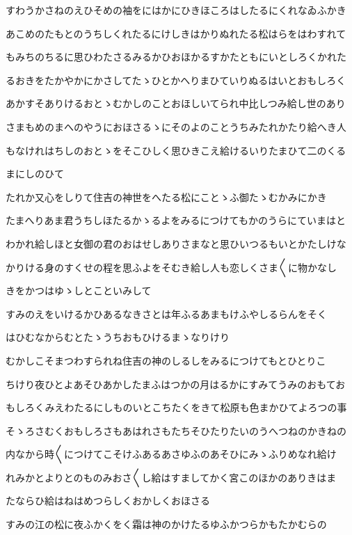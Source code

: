 \documentclass[a4paper,11pt,landscape]{ltjtarticle}
\begin{document}
すわうかさねのえひそめの袖をにはかにひきほころはしたるにくれなゐふかき
\par\medskip
あこめのたもとのうちしくれたるにけしきはかりぬれたる松はらをはわすれて
\par\medskip
もみちのちるに思ひわたさるみるかひおほかるすかたともにいとしろくかれた
\par\medskip
るおきをたかやかにかさしてたゝひとかへりまひていりぬるはいとおもしろく
\par\medskip
あかすそありけるおとゝむかしのことおほしいてられ中比しつみ給し世のあり
\par\medskip
さまもめのまへのやうにおほさるゝにそのよのことうちみたれかたり給へき人
\par\medskip
もなけれはちしのおとゝをそこひしく思ひきこえ給けるいりたまひて二のくる
\par\medskip
まにしのひて
\par\medskip
たれか又心をしりて住吉の神世をへたる松にことゝふ御たゝむかみにかき
\par\medskip
たまへりあま君うちしほたるかゝるよをみるにつけてもかのうらにていまはと
\par\medskip
わかれ給しほと女御の君のおはせしありさまなと思ひいつるもいとかたしけな
\par\medskip
かりける身のすくせの程を思ふよをそむき給し人も恋しくさま〱に物かなし
\par\medskip
きをかつはゆゝしとこといみして
\par\medskip
すみのえをいけるかひあるなきさとは年ふるあまもけふやしるらんをそく
\par\medskip
はひむなからむとたゝうちおもひけるまゝなりけり
\par\medskip
むかしこそまつわすられね住吉の神のしるしをみるにつけてもとひとりこ
\par\medskip
ちけり夜ひとよあそひあかしたまふはつかの月はるかにすみてうみのおもてお
\par\medskip
もしろくみえわたるにしものいとこちたくをきて松原も色まかひてよろつの事
\par\medskip
そゝろさむくおもしろさもあはれさもたちそひたりたいのうへつねのかきねの
\par\medskip
内なから時〱につけてこそけふあるあさゆふのあそひにみゝふりめなれ給け
\par\medskip
れみかとよりとのものみおさ〱し給はすましてかく宮このほかのありきはま
\par\medskip
たならひ給はねはめつらしくおかしくおほさる
\par\medskip
すみの江の松に夜ふかくをく霜は神のかけたるゆふかつらかもたかむらの
\end{document}
